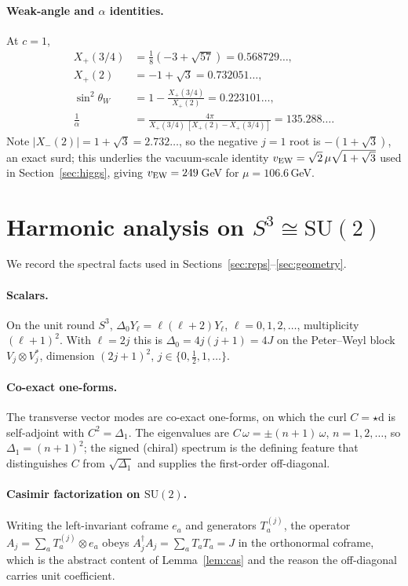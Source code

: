 \documentclass[11pt]{article}
\theoremstyle{plain}
\theoremstyle{definition}
\newcommand{\Xp}{X_{+}}
\newcommand{\Xm}{X_{-}}
\newcommand{\half}{\tfrac12}
\newcommand{\dd}{\mathrm{d}}
\newcommand{\SU}{\mathrm{SU}}
\begin{document}
\paragraph{Weak-angle and $\alpha$ identities.} At $c=1$,
\begin{align}
\Xp(3/4)&=\tfrac18(-3+\sqrt{57})=0.568729\ldots,\\
\Xp(2)&=-1+\sqrt3=0.732051\ldots,\\
\sin^2\theta_W&=1-\frac{\Xp(3/4)}{\Xp(2)}=0.223101\ldots,\\
\frac1\alpha&=\frac{4\pi}{\Xp(3/4)\,[\Xp(2)-\Xp(3/4)]}=135.288\ldots.
\end{align}
Note $|\Xm(2)|=1+\sqrt3=2.732\ldots$, so the negative $j=1$ root is
$-(1+\sqrt3)$, an exact surd; this underlies the vacuum-scale identity
$v_{\rm EW}=\sqrt2\,\mu\sqrt{1+\sqrt3}$ used in Section~\ref{sec:higgs},
giving $v_{\rm EW}=249\,$GeV for $\mu=106.6\,$GeV.

\section{Harmonic analysis on $S^3\cong\SU(2)$}
\label{app:s3}

We record the spectral facts used in Sections~\ref{sec:reps}--\ref{sec:geometry}.

\paragraph{Scalars.} On the unit round $S^3$, $\Delta_0 Y_\ell=\ell(\ell+2)Y_\ell$,
$\ell=0,1,2,\dots$, multiplicity $(\ell+1)^2$. With $\ell=2j$ this is
$\Delta_0=4j(j+1)=4J$ on the Peter--Weyl block
$V_j\otimes V_j^*$, dimension $(2j+1)^2$, $j\in\{0,\half,1,\dots\}$.

\paragraph{Co-exact one-forms.} The transverse vector modes are co-exact
one-forms, on which the curl $C=\star\dd$ is self-adjoint with
$C^2=\Delta_1$. The eigenvalues are $C\,\omega=\pm(n+1)\,\omega$,
$n=1,2,\dots$, so $\Delta_1=(n+1)^2$; the signed (chiral) spectrum is the
defining feature that distinguishes $C$ from $\sqrt{\Delta_1}$ and supplies
the first-order off-diagonal.

\paragraph{Casimir factorization on $\SU(2)$.} Writing the left-invariant
coframe $e_a$ and generators $T_a^{(j)}$, the operator
$A_j=\sum_aT_a^{(j)}\otimes e_a$ obeys $A_j^\dagger A_j=\sum_aT_aT_a=J$ in
the orthonormal coframe, which is the abstract content of
Lemma~\ref{lem:cas} and the reason the off-diagonal carries unit
coefficient.
\end{document}
